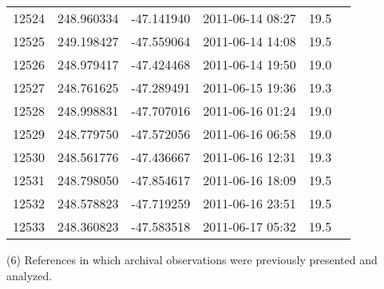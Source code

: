 \documentclass[iop,revtex4]{emulateapj}
\begin{document}
\begin{table}
\begin{minipage}{\linewidth}
{\begin{threeparttable}
\begin{tabular}{cccccc}
12524&248.960334&-47.141940&2011-06-14 08:27&19.5\\
12525&249.198427&-47.559064&2011-06-14 14:08&19.5\\
12526&248.979417&-47.424468&2011-06-14 19:50&19.0\\
12527&248.761625&-47.289491&2011-06-15 19:36&19.3\\
12528&248.998831&-47.707016&2011-06-16 01:24&19.0\\
12529&248.779750&-47.572056&2011-06-16 06:58&19.0\\
12530&248.561776&-47.436667&2011-06-16 12:31&19.3\\
12531&248.798050&-47.854617&2011-06-16 18:09&19.5\\
12532&248.578823&-47.719259&2011-06-16 23:51&19.5\\
12533&248.360823&-47.583518&2011-06-17 05:32&19.5\\
 \hline \hline
\end{tabular}
\begin{tablenotes}[flushleft]
\item (6) References in which archival observations were previously presented and analyzed.
\end{tablenotes}
\label{tab:archivalchandra}
\end{threeparttable}}
\end{minipage}
\end{table}
\end{document}
